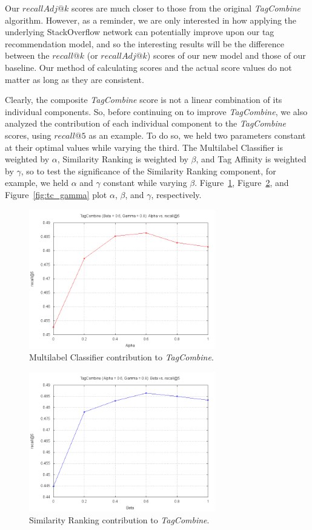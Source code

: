 \documentclass[11pt]{IEEEtran}
\begin{document}
Our $recallAdj@k$ scores are much closer to those from the original \textit{TagCombine} algorithm. However, as a reminder, we are only interested in how applying the underlying StackOverflow network can potentially improve upon our tag recommendation model, and so the interesting results will be the difference between the $recall@k$ (or $recallAdj@k$) scores of our new model and those of our baseline. Our method of calculating scores and the actual score values do not matter as long as they are consistent.

Clearly, the composite \textit{TagCombine} score is not a linear combination of its individual components. So, before continuing on to improve \textit{TagCombine}, we also analyzed the contribution of each individual component to the \textit{TagCombine} scores, using $recall@5$ as an example. To do so, we held two parameters constant at their optimal values while varying the third. The Multilabel Classifier is weighted by $\alpha$, Similarity Ranking is weighted by $\beta$, and Tag Affinity is weighted by $\gamma$, so to test the significance of the Similarity Ranking component, for example, we held $\alpha$ and $\gamma$ constant while varying $\beta$. Figure~\ref{fig:tc_alpha}, Figure~\ref{fig:tc_beta}, and Figure~\ref{fig:tc_gamma} plot $\alpha$, $\beta$, and $\gamma$, respectively.

\begin{figure}[h]
  \centering
    \includegraphics[width=3.2in]{tc_alpha.png}
  \caption{Multilabel Classifier contribution to \textit{TagCombine}.}
  \label{fig:tc_alpha}
\end{figure}

\begin{figure}[h]
  \centering
    \includegraphics[width=3.2in]{tc_beta.png}
  \caption{Similarity Ranking contribution to \textit{TagCombine}.}
  \label{fig:tc_beta}
\end{figure}
\end{document}
